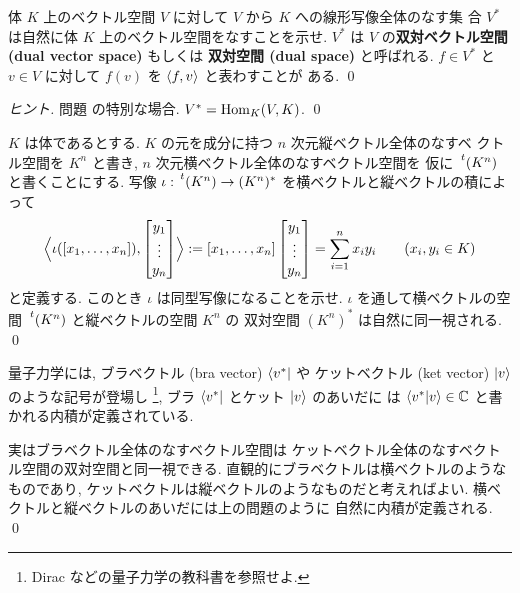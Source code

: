 \documentclass[12pt,twoside]{jarticle}
\begin{document}

\begin{question}[双対空間の定義]
  体 $K$ 上のベクトル空間 $V$ に対して $V$ から $K$ への線形写像全体のなす集
  合 $V^*$ は自然に体 $K$ 上のベクトル空間をなすことを示せ.
  $V^*$ は $V$ の{\bf 双対ベクトル空間 (dual vector space)} もしくは
  {\bf 双対空間 (dual space)} と呼ばれる.
  $f\in V^*$ と $v\in V$ に対して $f(v)$ を $\langle f,v\rangle$ と表わすことが
  ある.
  \qed
\end{question}

\begin{proof}[ヒント]
  問題  の特別な場合. $V^*=\mathop{\mathrm{Hom}}\nolimits_K(V,K)$. \qed
\end{proof}


\begin{question}[横ベクトルの空間と縦ベクトルの空間の双対性]
  $K$ は体であるとする. $K$ の元を成分に持つ $n$ 次元縦ベクトル全体のなすベ
  クトル空間を $K^n$ と書き, $n$ 次元横ベクトル全体のなすベクトル空間を
  仮に $\tp{(K^n)}$ と書くことにする.
  写像 $\iota:\tp{(K^n)}\to(K^n)^*$ を横ベクトルと縦ベクトルの積によって
  \begin{equation*}
    \Bigl\langle
    \iota([x_1,\ldots,x_n]), 
    \begin{bmatrix}
      y_1 \\ \vdots \\ y_n \\
    \end{bmatrix}
    \Bigr\rangle
    := 
    [x_1,\ldots,x_n]
    \begin{bmatrix}
      y_1 \\ \vdots \\ y_n \\
    \end{bmatrix}
    = \sum_{i=1}^n x_iy_i
    \qquad (x_i,y_i\in K)
  \end{equation*}
  と定義する. このとき $\iota$ は同型写像になることを示せ.
  $\iota$ を通して横ベクトルの空間 $\tp{(K^n)}$ と縦ベクトルの空間 $K^n$ の
  双対空間 $(K^n)^*$ は自然に同一視される.
  \qed
\end{question}

\begin{guide}[ブラとケット]
  \label{guide:bra-ket}
  量子力学には, ブラベクトル (bra vector) $\langle v^*|$ や
  ケットベクトル (ket vector) $|v\rangle$ のような記号が登場し%
  \footnote{Dirac \cite{Dirac} などの量子力学の教科書を参照せよ.},
  ブラ $\langle v^*|$ とケット $|v\rangle$ のあいだに
  は $\langle v^*|v\rangle\in{\mathbb C}$ と書かれる内積が定義されている.

  実はブラベクトル全体のなすベクトル空間は
  ケットベクトル全体のなすベクトル空間の双対空間と同一視できる.
  直観的にブラベクトルは横ベクトルのようなものであり,
  ケットベクトルは縦ベクトルのようなものだと考えればよい.
  横ベクトルと縦ベクトルのあいだには上の問題のように
  自然に内積が定義される.
  \qed
\end{guide}
\end{document}

